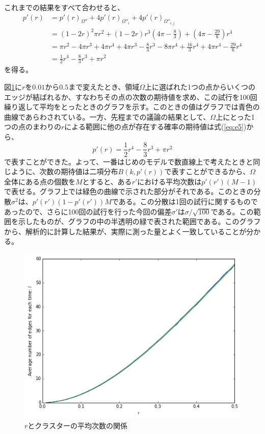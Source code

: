 これまでの結果をすべて合わせると、
\begin{align}
p'(r) &= p'(r)_{\Omega''} + 4p'(r)_{\Omega''_{i}} + 4p'(r)_{\Omega''_{i,j}}\nonumber \\
&= (1-2r)^{2}\pi r^{2} + (1-2r)r^{3}\left( 4\pi-\frac{8}{3} \right) + \left(4\pi -\frac{29}{6}\right)r^{4}\nonumber \\
&= \pi r^{2} - 4\pi r^{3} + 4\pi r^{4} + 4\pi r^{3} -\frac{8}{3}r^{3} - 8\pi r^{4} + \frac{16}{3}r^{4} + 4\pi r^{4} - \frac{29}{6}r^{4}\nonumber \\
&= \frac{1}{2}r^{4} -\frac{8}{3}r^{3} + \pi r^{2}
\label{eq:e5}
\end{align}
を得る。

図\ref{fig:f23}に$r$を$0.01$から$0.5$まで変えたとき、領域$\Omega$上に選ばれた1つの点からいくつのエッジが結ばれるか、すなわちその点の次数の期待値を求め、この試行を100回繰り返して平均をとったときのグラフを示す。このときの値はグラフでは青色の曲線であらわされている。一方、先程までの議論の結果として、$\Omega$上にとった1つの点のまわりの$r$による範囲に他の点が存在する確率の期待値は式(\ref{eq:e5})から、
\[p'(r) = \frac{1}{2}r^{4} -\frac{8}{3}r^{3} + \pi r^{2}\]
で表すことができた。よって、一番はじめのモデルで数直線上で考えたときと同じように、次数の期待値は二項分布$B(k,p'(r))$で表すことができるから、$\Omega$全体にある点の個数を$M$とすると、ある$r'$における平均次数は$p'(r')(M-1)$で表せる。グラフ上では緑色の曲線で示された部分がそれである。このときの分散$\sigma^{2}$は、$p'(r')(1-p'(r'))M$である。この分散は1回の試行に関するものであったので、さらに100回の試行を行った今回の偏差$\sigma'$は$\sigma/\sqrt{100}$である。この範囲を示したものが、グラフの中の半透明の緑で表された範囲である。このグラフから、解析的に計算した結果が、実際に測った量とよく一致していることが分かる。
\begin{figure}[H]
    \begin{center}
        \includegraphics[width=12.5cm]{../img/r_l.png}
        \caption{$r$とクラスターの平均次数の関係}
        \label{fig:f23}
    \end{center}
\end{figure}

